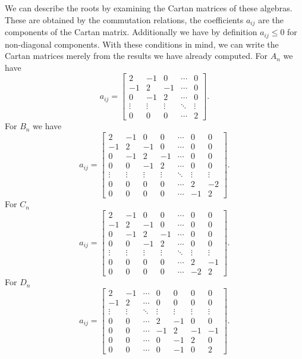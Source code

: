 We can describe the roots by examining the Cartan matrices of
these algebras. These are obtained by the commutation relations,
the coefficients $a_{ij}$ are the components of the Cartan
matrix. Additionally we have by definition $a_{ij}\leq 0$ for
non-diagonal components. With these conditions in mind, we can
write the Cartan matrices merely from the results we have already
computed. For $A_{n}$ we have
\begin{equation}
a_{ij} = \begin{bmatrix}
2  & -1 & 0  & \cdots & 0\\
-1 & 2  & -1 & \cdots & 0\\
0  & -1 & 2  & \cdots & 0\\
\vdots & \vdots & \vdots & \ddots & \vdots\\
0 & 0 & 0 & \cdots & 2
\end{bmatrix}.
\end{equation}
For $B_{n}$ we have
\begin{equation}
a_{ij} = \begin{bmatrix}
2   & -1 & 0  & 0 & \cdots & 0 & 0\\
-1  & 2  & -1 & 0 & \cdots & 0 & 0\\
0   & -1 &  2 &-1 & \cdots & 0 & 0\\
0   & 0  & -1 & 2 &  \cdots & 0 & 0\\
\vdots & \vdots & \vdots & \vdots & \ddots & \vdots & \vdots\\
0   & 0  & 0  & 0 &  \cdots & 2 & -2\\
0   & 0  & 0  & 0 &  \cdots & -1 & 2
\end{bmatrix}.
\end{equation}
For $C_{n}$ 
\begin{equation}
a_{ij} = \begin{bmatrix}
2   & -1 & 0  & 0 & \cdots & 0 & 0\\
-1  & 2  & -1 & 0 & \cdots & 0 & 0\\
0   & -1 &  2 &-1 & \cdots & 0 & 0\\
0   & 0  & -1 & 2 &  \cdots & 0 & 0\\
\vdots & \vdots & \vdots & \vdots & \ddots & \vdots & \vdots\\
0   & 0  & 0  & 0 &  \cdots & 2 & -1\\
0   & 0  & 0  & 0 &  \cdots & -2 & 2
\end{bmatrix}.
\end{equation}
For $D_{n}$
\begin{equation}
a_{ij} =
\begin{bmatrix}
2      & -1    & \cdots & 0      &  0     &   0    & 0\\
-1     &  2    & \cdots & 0      &  0     &   0    & 0\\
\vdots & \vdots& \ddots & \vdots & \vdots & \vdots & \vdots\\
0      & 0     & \cdots & 2      & -1     &   0    & 0\\
0      & 0     & \cdots & -1     &  2     &  -1    &-1\\  
0      &  0    & \cdots & 0      &  -1    &   2    & 0\\
0      &  0    & \cdots & 0      &  -1    &   0    & 2
\end{bmatrix}.
\end{equation}
